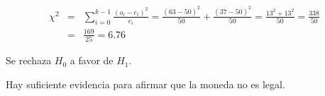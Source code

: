 \begin{solucion}
 \begin{estadistico}
  \begin{eqnarray*}
   \chi^2 & = & \sum_{i=0}^{k-1} \frac{\left( o_i - e_i \right)^2}{e_i}
   =\frac{(63 - 50)^2}{50} + \frac{(37 - 50)^2}{50}
   = \frac{13^2 + 13^2}{50} = \frac{338}{50} \\
   & = & \frac{169}{25} = 6.76
  \end{eqnarray*}
 \end{estadistico}

 \begin{decision}
  Se rechaza $H_0$ a favor de $H_1$.
 \end{decision}

 \begin{conclusion}
  Hay suficiente evidencia para afirmar que la moneda no es legal.
 \end{conclusion}
 

\end{solucion}
